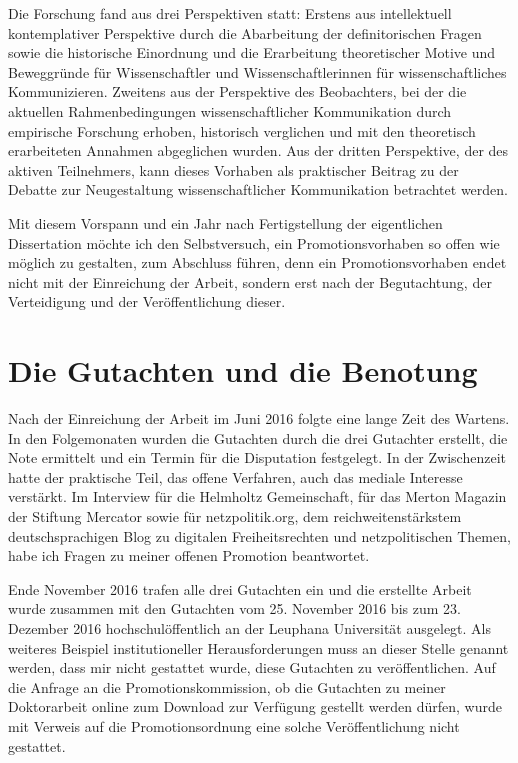 Die Forschung fand aus drei Perspektiven statt: Erstens aus intellektuell kontemplativer Perspektive durch die Abarbeitung der definitorischen Fragen sowie die historische Einordnung und die Erarbeitung theoretischer Motive und Beweggründe für Wissenschaftler und Wissenschaftlerinnen für wissenschaftliches Kommunizieren. Zweitens aus der Perspektive des Beobachters, bei der die aktuellen Rahmenbedingungen wissenschaftlicher Kommunikation durch empirische Forschung erhoben, historisch verglichen und mit den theoretisch erarbeiteten Annahmen abgeglichen wurden. Aus der dritten Perspektive, der des aktiven Teilnehmers, kann dieses Vorhaben als praktischer Beitrag zu der Debatte zur Neugestaltung wissenschaftlicher Kommunikation betrachtet werden.

Mit diesem Vorspann und ein Jahr nach Fertigstellung der eigentlichen Dissertation möchte ich den Selbstversuch, ein Promotionsvorhaben so offen wie möglich zu gestalten, zum Abschluss führen, denn ein Promotionsvorhaben endet nicht mit der Einreichung der Arbeit, sondern erst nach der Begutachtung, der Verteidigung und der Veröffentlichung dieser.

\section{Die Gutachten und die Benotung}

Nach der Einreichung der Arbeit im Juni 2016 folgte eine lange Zeit des Wartens. In den Folgemonaten wurden die Gutachten durch die drei Gutachter erstellt, die Note ermittelt und ein Termin für die Disputation festgelegt. In der Zwischenzeit hatte der praktische Teil, das offene Verfahren, auch das mediale Interesse verstärkt. Im Interview für die Helmholtz Gemeinschaft, für das Merton Magazin der Stiftung Mercator sowie für netzpolitik.org, dem reichweitenstärkstem deutschsprachigen Blog zu digitalen Freiheitsrechten und netzpolitischen Themen, habe ich Fragen zu meiner offenen Promotion beantwortet.

Ende November 2016 trafen alle drei Gutachten ein und die erstellte Arbeit wurde zusammen mit den Gutachten vom 25. November 2016 bis zum 23. Dezember 2016 hochschulöffentlich an der Leuphana Universität ausgelegt. Als weiteres Beispiel institutioneller Herausforderungen muss an dieser Stelle genannt werden, dass mir nicht gestattet wurde, diese Gutachten zu veröffentlichen. Auf die Anfrage an die Promotionskommission, ob die Gutachten zu meiner Doktorarbeit online zum Download zur Verfügung gestellt werden dürfen, wurde mit Verweis auf die Promotionsordnung  eine solche Veröffentlichung nicht gestattet.

